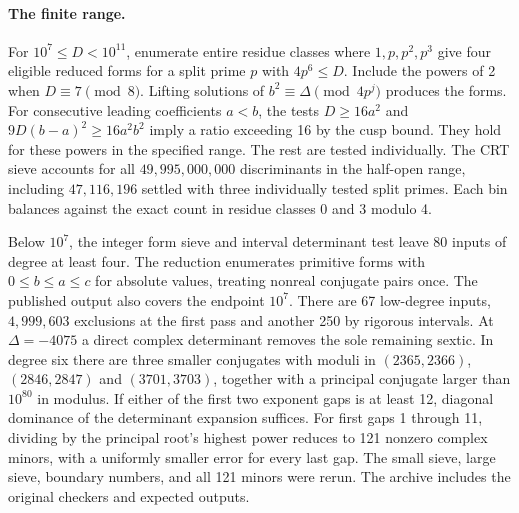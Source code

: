 \paragraph{The finite range.}
For $10^7\le D<10^{11}$, enumerate entire residue classes where $1,p,p^2,p^3$ give four eligible reduced forms for a split prime $p$ with $4p^6\le D$. Include the powers of 2 when $D\equiv7\pmod 8$. Lifting solutions of $b^2\equiv\Delta\pmod{4p^j}$ produces the forms. For consecutive leading coefficients $a<b$, the tests $D\ge16a^2$ and $9D(b-a)^2\ge16a^2b^2$ imply a ratio exceeding 16 by the cusp bound. They hold for these powers in the specified range. The rest are tested individually. The CRT sieve accounts for all $49{,}995{,}000{,}000$ discriminants in the half-open range, including $47{,}116{,}196$ settled with three individually tested split primes. Each bin balances against the exact count in residue classes 0 and 3 modulo 4.

Below $10^7$, the integer form sieve and interval determinant test leave 80 inputs of degree at least four. The reduction enumerates primitive forms with $0\le b\le a\le c$ for absolute values, treating nonreal conjugate pairs once. The published output also covers the endpoint $10^7$. There are 67 low-degree inputs, $4{,}999{,}603$ exclusions at the first pass and another 250 by rigorous intervals. At $\Delta=-4075$ a direct complex determinant removes the sole remaining sextic. In degree six there are three smaller conjugates with moduli in $(2365,2366)$, $(2846,2847)$ and $(3701,3703)$, together with a principal conjugate larger than $10^{80}$ in modulus. If either of the first two exponent gaps is at least 12, diagonal dominance of the determinant expansion suffices. For first gaps 1 through 11, dividing by the principal root's highest power reduces to 121 nonzero complex minors, with a uniformly smaller error for every last gap. The small sieve, large sieve, boundary numbers, and all 121 minors were rerun. The archive includes the original checkers and expected outputs.\cite{prior}


